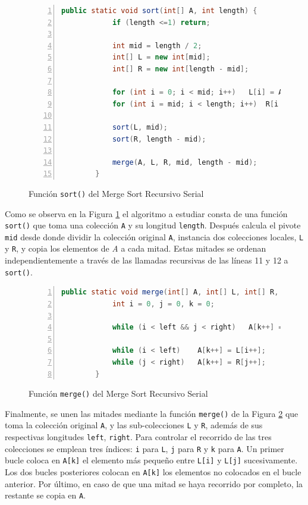 \documentclass[titlepage]{article}
\begin{document}
\begin{figure}[hbtp]
    \begin{lstlisting}[language=java, frame=single, numbers=left]
        public static void sort(int[] A, int length) {
            if (length <=1) return;
    
            int mid = length / 2;
            int[] L = new int[mid];
            int[] R = new int[length - mid];
    
            for (int i = 0; i < mid; i++)   L[i] = A[i];
            for (int i = mid; i < length; i++)  R[i - mid] = A[i];
    
            sort(L, mid);
            sort(R, length - mid);
    
            merge(A, L, R, mid, length - mid);
        }
    \end{lstlisting}
    \caption{Función \lstinline{sort()} del Merge Sort Recursivo Serial}
    \label{fig:MSRS_sort()}
\end{figure}

Como se observa en la Figura \ref{fig:MSRS_sort()} el algoritmo a estudiar consta de una función \lstinline{sort()} que toma una colección \lstinline{A} y su longitud \lstinline{length}. Después calcula el pivote \lstinline{mid} desde donde dividir la colección original \lstinline{A}, instancia dos colecciones locales, \lstinline{L} y \lstinline{R}, y copia los elementos de \textit{A} a cada mitad. Estas mitades se ordenan independientemente a través de las llamadas recursivas de las líneas 11 y 12 a \lstinline{sort()}. 

\begin{figure}[hbtp]
    \begin{lstlisting}[language=java, frame=single, numbers=left]
        public static void merge(int[] A, int[] L, int[] R, int left, int right) {
            int i = 0, j = 0, k = 0;
    
            while (i < left && j < right)   A[k++] = (L[i] <= R[j])? L[i++] : R[j++];
    
            while (i < left)    A[k++] = L[i++];
            while (j < right)   A[k++] = R[j++];
        }
    \end{lstlisting}
    \caption{Función \lstinline{merge()} del Merge Sort Recursivo Serial}
    \label{fig:MSRS_merge()}
\end{figure}

Finalmente, se unen las mitades mediante la función \lstinline{merge()} de la Figura \ref{fig:MSRS_merge()} que toma la colección original \lstinline{A}, y las sub-colecciones \lstinline{L} y \lstinline{R}, además de sus respectivas longitudes \lstinline{left}, \lstinline{right}. Para controlar el recorrido de las tres colecciones se emplean tres índices: \lstinline{i} para \lstinline{L}, \lstinline{j} para \lstinline{R} y \lstinline{k} para \lstinline{A}. Un primer bucle coloca en \lstinline{A[k]} el elemento más pequeño entre \lstinline{L[i]} y \lstinline{L[j]} sucesivamente. Los dos bucles posteriores colocan en \lstinline{A[k]} los elementos no colocados en el bucle anterior. Por último, en caso de que una mitad se haya recorrido por completo, la restante se copia en \lstinline{A}.
\end{document}
